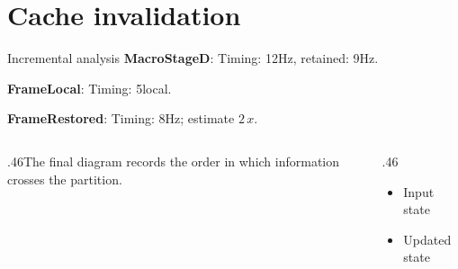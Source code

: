 \documentclass[10pt,aspectratio=169]{beamer}
\newcommand{\fuzzlayerA}[1]{\textbf{#1}}
\newcommand{\fuzzlayerB}[1]{\fuzzlayerA{#1}}
\newcommand{\fuzzterm}[1]{\fuzzlayerB{#1}}
\newcommand{\fuzzpair}[2]{\fuzzterm{#1}: #2}
\newcommand{\fuzzunit}{Hz}
\let\fuzzoriginalunit\fuzzunit
\newcommand{\fuzzcoefficient}{2}
\newcommand{\fuzzscale}[2][\fuzzcoefficient]{#1\,#2}
\begin{document}
\section{Cache invalidation}
\begin{frame}[t]{Incremental analysis}
\fuzzpair{MacroStageD}{Timing: 12\fuzzunit, retained: 9\fuzzoriginalunit.}\par
{\renewcommand{\fuzzunit}{local}\fuzzpair{FrameLocal}{Timing: 5\fuzzunit.}\par}
\fuzzpair{FrameRestored}{Timing: 8\fuzzunit; estimate $\fuzzscale{x}$.}\par
\begin{columns}[T]\begin{column}{.46\textwidth}The final diagram records the order in which information crosses the partition.\end{column}\begin{column}{.46\textwidth}\begin{itemize}\item Input state\item Updated state\end{itemize}\end{column}\end{columns}
\end{frame}
\end{document}
